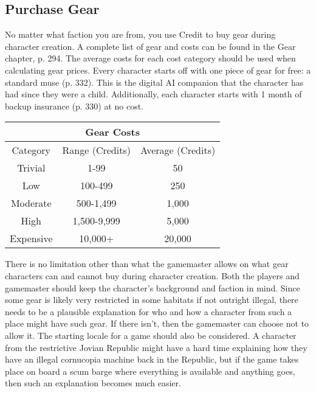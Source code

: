 \subsection{Purchase Gear} \label{sec:purchase-gear} 

No matter what faction you are from, you use Credit to buy gear during character creation. A complete list of gear and costs can be found in the Gear chapter, p. 294. The average costs for each cost category should be used when calculating gear prices. Every character starts off with one piece of gear for free: a standard muse (p. 332). This is the digital AI companion that the character has had since they were a child. Additionally, each character starts with 1 month of backup insurance (p. 330) at no cost. 

\begin{center} \begin{tabular}{|c|c|c|} \hline

\multicolumn{3}{|c|}{Gear Costs} \\ \hline

Category &Range (Credits) &Average (Credits)\\ \hline

Trivial &1-99 &50\\ \hline

Low &100-499 &250\\ \hline

Moderate &500-1,499 &1,000\\ \hline

High &1,500-9,999 &5,000\\ \hline

Expensive &10,000+ &20,000\\ \hline \end{tabular} \end{center} 

There is no limitation other than what the gamemaster allows on what gear characters can and cannot buy during character creation. Both the players and gamemaster should keep the character’s background and faction in mind. Since some gear is likely very restricted in some habitats if not outright illegal, there needs to be a plausible explanation for who and how a character from such a place might have such gear. If there isn’t, then the gamemaster can choose not to allow it. The starting locale for a game should also be considered. A character from the restrictive Jovian Republic might have a hard time explaining how they have an illegal cornucopia machine back in the Republic, but if the game takes place on board a scum barge where everything is available and anything goes, then such an explanation becomes much easier. 

